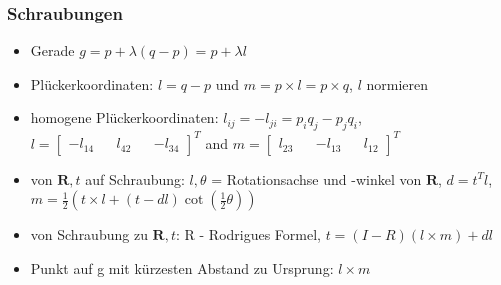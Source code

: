 \documentclass[11pt]{article}
\begin{document}
\subsubsection{Schraubungen}
\begin{itemize}
    \item Gerade $g = p + \lambda (q-p) = p + \lambda l$
    \item Plückerkoordinaten: $l = q -p $ und $m = p \times l = p \times q$, $l$ normieren
    \item homogene Plückerkoordinaten: $l_{ij} = -l_{ji} = p_i q_j - p_j q_i$, $l = \begin{bmatrix} -l_{14} && l_{42} && -l_{34} \end{bmatrix}^T$ and $m = \begin{bmatrix} l_{23} && -l_{13} && l_{12} \end{bmatrix}^T$
    \item von $\boldsymbol{R}, t$ auf Schraubung: $l, \theta$ = Rotationsachse und -winkel von $\boldsymbol{R}$, $d = t^T l$, $m = \frac{1}{2} (t \times l + (t - dl) \cot{(\frac{1}{2} \theta)})$
    \item von Schraubung zu $\boldsymbol{R}, t$: R - Rodrigues Formel, $t = (I - R) (l \times m) + dl$
    \item Punkt auf g mit kürzesten Abstand zu Ursprung: $l \times m$
\end{itemize}
\end{document}
